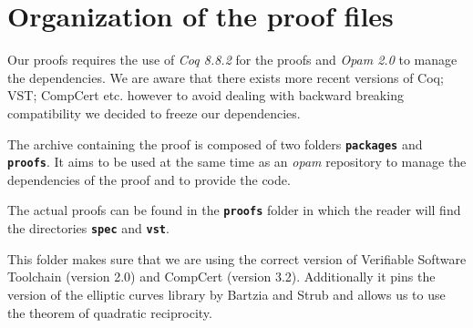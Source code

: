 \section{Organization of the proof files}
\label{appendix:proof-folders}

Our proofs requires the use of \emph{Coq 8.8.2} for the proofs and
\emph{Opam 2.0} to manage the dependencies. We are aware that there exists more
recent versions of Coq; VST; CompCert etc. however to avoid dealing with backward
breaking compatibility we decided to freeze our dependencies.

The archive containing the proof is composed of two folders \textbf{\texttt{packages}}
and \textbf{\texttt{proofs}}.
It aims to be used at the same time as an \emph{opam} repository to manage
the dependencies of the proof and to provide the code.

The actual proofs can be found in the \textbf{\texttt{proofs}} folder in which
the reader will find the directories \textbf{\texttt{spec}} and \textbf{\texttt{vst}}.

This folder makes sure that we are using the correct version of
Verifiable Software Toolchain (version 2.0) and CompCert (version 3.2).
Additionally it pins the version of the elliptic curves library by Bartzia and Strub
and allows us to use the theorem of quadratic reciprocity.


